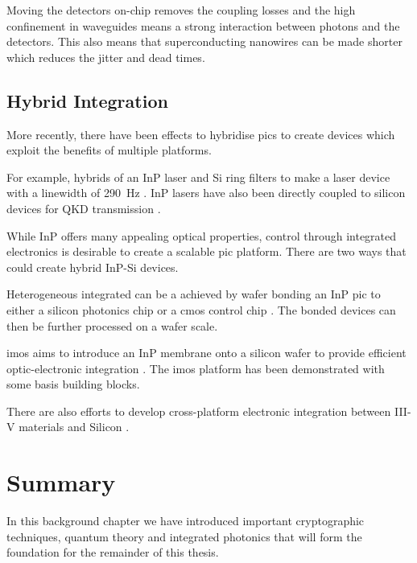Moving the detectors on-chip removes the coupling losses and the high confinement in waveguides means a strong interaction between photons and the detectors. This also means that superconducting nanowires can be made shorter which reduces the jitter and dead times.

\subsection{Hybrid Integration}

More recently, there have been effects to hybridise \acp{pic} to create devices which exploit the benefits of multiple platforms. 

For example, hybrids of an \ac{InP} laser and Si ring filters to make a laser device with a linewidth of \SI{290}{Hz} \cite{Fan2017}. \ac{InP} lasers have also been directly coupled to silicon devices for \ac{QKD} transmission \cite{Agnesi2019}.

While \ac{InP} offers many appealing optical properties, control through integrated electronics is desirable to create a scalable \ac{pic} platform. There are two ways that could create hybrid \ac{InP}-Si devices. 

Heterogeneous integrated can be a achieved by wafer bonding an \ac{InP} \ac{pic} to either a silicon photonics chip or a \ac{cmos} control chip \cite{jeppix}. The bonded devices can then be further processed on a wafer scale.

\Ac{imos} aims to introduce an \ac{InP} membrane onto a silicon wafer to provide efficient optic-electronic integration \cite{jeppix, IMOS}. The \ac{imos} platform has been demonstrated with some basis building blocks.

There are also efforts to develop cross-platform electronic integration between III-V materials and Silicon \cite{}. 

\section{Summary}

In this background chapter we have introduced important cryptographic techniques, quantum theory and integrated photonics that will form the foundation for the remainder of this thesis.

